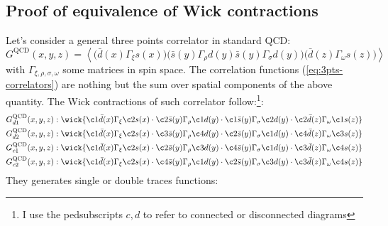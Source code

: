 \documentclass[english, LaM, oneside, noexaminfo]{sapthesis}
\newcommand{\la}{\langle}
\newcommand{\ra}{\rangle}
\begin{document}
\subsection{Proof of equivalence of Wick contractions}
\noindent
Let's consider a general three points correlator in standard QCD:
\begin{equation*}
    G^\text{QCD}(x,y,z) = \left\la \bigg(\bar d(x) \Gamma_\xi s(x)\bigg) \bigg(\bar s(y) \Gamma_\rho d(y) \bar s(y) \Gamma_\sigma d(y)\bigg) \bigg(\bar d(z) \Gamma_\omega s(z)\bigg) \right\ra
\end{equation*}
with $\Gamma_{\xi,\rho,\sigma,\omega}$ some matrices in spin space.
The correlation functions (\ref{eq:3pts-correlators}) are nothing but the sum over spatial components of the above quantity.
The Wick contractions of such correlator follow:\footnote{I use the pedsubscripts $c,d$ to refer to connected or disconnected diagrams}:
\begin{equation*}
    \begin{split}
        & G_{d1}^\text{QCD}(x,y,z): \wick{\c1{\bar d (x)} \Gamma_\xi \c2{s(x)} \cdot \c2{\bar s (y)} \Gamma_\rho \c1{d (y)} \cdot \c1{\bar s (y)} \Gamma_\sigma \c2{d(y)} \cdot \c2{\bar d (z)} \Gamma_\omega \c1{s (z)} } \\
        & G_{d2}^\text{QCD}(x,y,z): \wick{\c1{\bar d (x)} \Gamma_\xi \c2{s(x)} \cdot \c3{\bar s (y)} \Gamma_\rho \c4{d (y)} \cdot \c2{\bar s (y)} \Gamma_\sigma \c1{d(y)} \cdot \c4{\bar d (z)} \Gamma_\omega \c3{s (z)} } \\
        & G_{c1}^\text{QCD}(x,y,z): \wick{\c1{\bar d (x)} \Gamma_\xi \c2{s(x)} \cdot \c2{\bar s (y)} \Gamma_\rho \c3{d (y)} \cdot \c4{\bar s (y)} \Gamma_\sigma \c1{d(y)} \cdot \c3{\bar d (z)} \Gamma_\omega \c4{s (z)} } \\
        & G_{c2}^\text{QCD}(x,y,z): \wick{\c1{\bar d (x)} \Gamma_\xi \c2{s(x)} \cdot \c4{\bar s (y)} \Gamma_\rho \c1{d (y)} \cdot \c2{\bar s (y)} \Gamma_\sigma \c3{d(y)} \cdot \c3{\bar d (z)} \Gamma_\omega \c4{s (z)} } \\
    \end{split}
\end{equation*}
They generates single or double traces functions:
\end{document}
